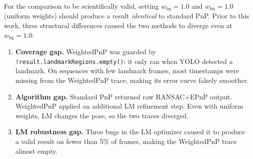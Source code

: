 \documentclass[12pt,a4paper]{article}
\begin{document}
For the comparison to be scientifically valid, setting $w_\text{bg} = 1.0$ and
$w_\text{lm} = 1.0$ (uniform weights) should produce a result \emph{identical} to
standard PnP. Prior to this work, three structural differences caused the two methods
to diverge even at $w_\text{bg}=1.0$:

\begin{enumerate}
  \item \textbf{Coverage gap.} WeightedPnP was guarded by
        \texttt{!result.landmarkRegions.empty()}: it only ran when YOLO detected a
        landmark. On sequences with few landmark frames, most timestamps were missing
        from the WeightedPnP trace, making its error curve falsely smoother.

  \item \textbf{Algorithm gap.} Standard PnP returned raw RANSAC+EPnP output.
        WeightedPnP applied an additional LM refinement step. Even with uniform
        weights, LM changes the pose, so the two traces diverged.

  \item \textbf{LM robustness gap.} Three bugs in the LM optimizer caused it to
        produce a valid result on fewer than 5\% of frames, making the WeightedPnP
        trace almost empty.
\end{enumerate}
\end{document}
